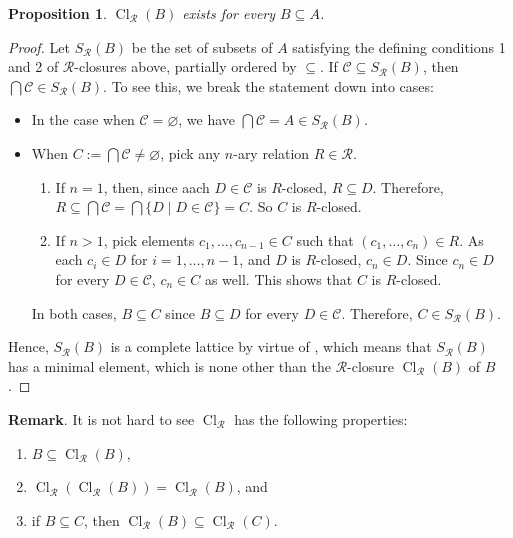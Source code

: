 \documentclass[12pt]{article}
\newtheorem{prop}{Proposition}
\begin{document}
\begin{prop} $\operatorname{Cl}_{\mathcal{R}}(B)$ exists for every $B\subseteq A$. \end{prop}
\begin{proof}
Let $S_{\mathcal{R}}(B)$ be the set of subsets of $A$ satisfying the defining conditions 1 and 2 of $\mathcal{R}$-closures above, partially ordered by $\subseteq$.  If $\mathcal{C} \subseteq S_{\mathcal{R}}(B)$, then $\bigcap \mathcal{C} \in S_{\mathcal{R}}(B)$.  To see this, we break the statement down into cases:
\begin{itemize}
\item 
In the case when $\mathcal{C}=\varnothing$, we have $\bigcap \mathcal{C} = A\in S_{\mathcal{R}}(B)$.  
\item
When $C:=\bigcap \mathcal{C}\ne \varnothing$, pick any $n$-ary relation $R\in \mathcal{R}$.  
\begin{enumerate}
\item
If $n=1$, then, since aach $D\in \mathcal{C}$ is $R$-closed, $R\subseteq D$.  Therefore, $R\subseteq \bigcap \mathcal{C} = \bigcap \lbrace D \mid D \in \mathcal{C}\rbrace = C$.  So $C$ is $R$-closed.
\item
If $n>1$, pick elements $c_1,\ldots, c_{n-1}\in C$ such that $(c_1,\ldots, c_n)\in R$.  As each $c_i\in D$ for $i=1,\ldots, n-1$, and $D$ is $R$-closed, $c_n\in D$.  Since $c_n\in D$ for every $D\in \mathcal{C}$, $c_n\in C$ as well.  This shows that $C$ is $R$-closed.  
\end{enumerate}
In both cases, $B\subseteq C$ since $B\subseteq D$ for every $D\in \mathcal{C}$.  Therefore, $C\in S_{\mathcal{R}}(B)$.
\end{itemize}
Hence, $S_{\mathcal{R}}(B)$ is a complete lattice by virtue of , which means that $S_{\mathcal{R}}(B)$ has a minimal element, which is none other than the $\mathcal{R}$-closure $\operatorname{Cl}_{\mathcal{R}}(B)$ of $B$.
\end{proof}

\textbf{Remark}.  It is not hard to see $\operatorname{Cl}_{\mathcal{R}}$ has the following properties:
\begin{enumerate}
\item $B\subseteq \operatorname{Cl}_{\mathcal{R}}(B)$,
\item $\operatorname{Cl}_{\mathcal{R}}(\operatorname{Cl}_{\mathcal{R}}(B))= \operatorname{Cl}_{\mathcal{R}}(B)$, and
\item if $B\subseteq C$, then $\operatorname{Cl}_{\mathcal{R}}(B)\subseteq \operatorname{Cl}_{\mathcal{R}}(C)$.
\end{enumerate}
\end{document}
